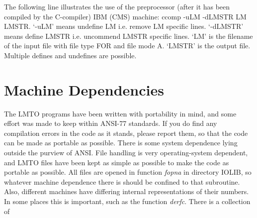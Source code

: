 \documentclass[aps,twocolumn,a4]{revtex4}
\begin{document}
The following line illustrates the use of the preprocessor (after it has
been compiled by the C-compiler) IBM (CMS) machine: ccomp -uLM -dLMSTR
LM LMSTR. `-uLM' means undefine LM i.e. remove LM specific lines.
`-dLMSTR' means define LMSTR i.e. uncommend LMSTR specific lines. `LM'
is the filename of the input file with file type FOR and file mode A.
`LMSTR' is the output file.  Multiple defines and undefines are
possible.
%
\section{Machine Dependencies}
\label{machines}

The LMTO programs have been written with portability in mind, and some
effort was made to keep within ANSI-77 standards.  If you do find any
compilation errors in the code as it stands, please report them, so that
the code can be made as portable as possible.  There is some system
dependence lying outside the purview of ANSI.  File handling is very
operating-system dependent, and LMTO files have been kept as simple as
possible to make the code as portable as possible.  All files are opened
in function {\em fopna} in directory IOLIB,
so whatever machine dependence there is
should be confined to that subroutine.  Also, different machines have
differing internal representations of their numbers.  In some places
this is important, such as the function {\em derfc}.
There is a collection of
\end{document}
